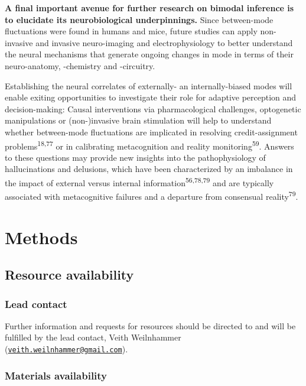\documentclass[
]{article}
\begin{document}
\textbf{A final important avenue for further research on bimodal
inference is to elucidate its neurobiological underpinnings.} Since
between-mode fluctuations were found in humans and mice, future studies
can apply non-invasive and invasive neuro-imaging and electrophysiology
to better understand the neural mechanisms that generate ongoing changes
in mode in terms of their neuro-anatomy, -chemistry and -circuitry.

Establishing the neural correlates of externally- an internally-biased
modes will enable exiting opportunities to investigate their role for
adaptive perception and decision-making: Causal interventions via
pharmacological challenges, optogenetic manipulations or (non-)invasive
brain stimulation will help to understand whether between-mode
fluctuations are implicated in resolving credit-assignment
problems\textsuperscript{18,77} or in calibrating metacognition and
reality monitoring\textsuperscript{59}. Answers to these questions may
provide new insights into the pathophysiology of hallucinations and
delusions, which have been characterized by an imbalance in the impact
of external versus internal information\textsuperscript{56,78,79} and
are typically associated with metacognitive failures and a departure
from consensual reality\textsuperscript{79}.

\newpage

\hypertarget{methods}{%
\section{Methods}\label{methods}}

\hypertarget{resource-availability}{%
\subsection{Resource availability}\label{resource-availability}}

\hypertarget{lead-contact}{%
\subsubsection{Lead contact}\label{lead-contact}}

Further information and requests for resources should be directed to and
will be fulfilled by the lead contact, Veith Weilnhammer
(\href{mailto:veith.weilnhammer@gmail.com}{\nolinkurl{veith.weilnhammer@gmail.com}}).

\hypertarget{materials-availability}{%
\subsubsection{Materials availability}\label{materials-availability}}
\end{document}
